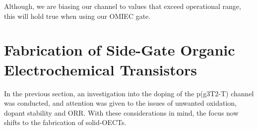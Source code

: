 Although, we are biasing our channel to values that exceed operational range, this will hold true when using our OMIEC gate. %







\section{Fabrication of Side-Gate Organic Electrochemical Transistors}

In the previous section, an investigation into the doping of the p(g3T2-T) channel was conducted, and attention was given to the issues of unwanted oxidation, dopant stability and ORR. With these considerations in mind, the focus now shifts to the fabrication of solid-OECTs. 

